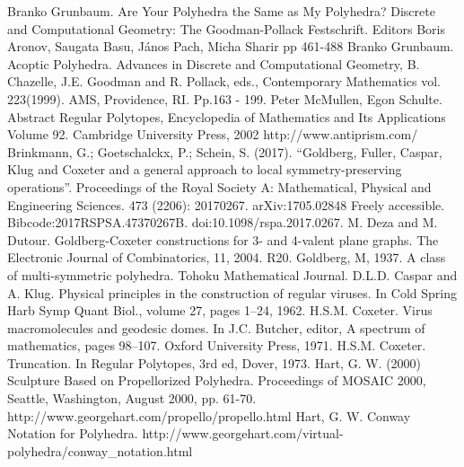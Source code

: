 \documentclass{amsart}[12pt]
\begin{document}
\begin{thebibliography}{1}
 Branko Grunbaum. Are Your Polyhedra the Same as My
  Polyhedra? Discrete and Computational Geometry: The Goodman-Pollack
  Festschrift. Editors Boris Aronov, Saugata Basu, János Pach, Micha Sharir
  pp 461-488
 Branko Grunbaum. Acoptic Polyhedra. Advances in Discrete
  and Computational Geometry, B. Chazelle, J.E. Goodman and R. Pollack, eds.,
  Contemporary Mathematics vol. 223(1999). AMS, Providence, RI. Pp.163 - 199.
 Peter McMullen, Egon Schulte. Abstract Regular Polytopes,
  Encyclopedia of Mathematics and Its Applications Volume 92.
  Cambridge University Press, 2002
 http://www.antiprism.com/
 Brinkmann, G.; Goetschalckx, P.; Schein, S. (2017).
  ``Goldberg, Fuller, Caspar, Klug and Coxeter and a general approach to local
  symmetry-preserving operations''. Proceedings of the Royal Society A:
  Mathematical, Physical and Engineering Sciences. 473 (2206): 20170267.
  arXiv:1705.02848 Freely accessible. Bibcode:2017RSPSA.47370267B.
  doi:10.1098/rspa.2017.0267.
 M. Deza and M. Dutour. Goldberg-Coxeter constructions for 3-
   and 4-valent plane graphs. The Electronic Journal of Combinatorics,
   11, 2004. R20.
 Goldberg, M, 1937. A class of multi-symmetric polyhedra.
    Tohoku Mathematical Journal.
 D.L.D. Caspar and A. Klug. Physical principles in the
  construction of regular viruses. In Cold Spring Harb Symp Quant Biol.,
  volume 27, pages 1–24, 1962.
 H.S.M. Coxeter. Virus macromolecules and geodesic domes.
  In J.C. Butcher, editor, A spectrum of mathematics, pages 98–107.
  Oxford University Press, 1971.
 H.S.M. Coxeter. Truncation. In Regular Polytopes, 3rd ed, Dover, 1973.
 Hart, G. W. (2000) Sculpture Based on Propellorized
  Polyhedra. Proceedings of MOSAIC 2000, Seattle, Washington, August 2000,
  pp. 61-70.  http://www.georgehart.com/propello/propello.html
 Hart, G. W. Conway Notation for Polyhedra.
  http://www.georgehart.com/virtual-polyhedra/conway\_notation.html
\end{thebibliography}

\appendix
\end{document}
